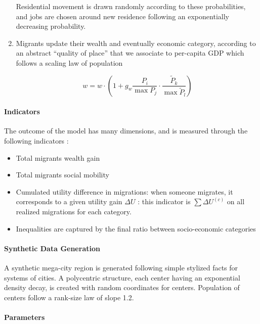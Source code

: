 \begin{enumerate}
Residential movement is drawn randomly according to these probabilities, and jobs are chosen around new residence following an exponentially decreasing probability.

\item Migrants update their wealth and eventually economic category, according to an abstract ``quality of place'' that we associate to per-capita GDP which follows a scaling law of population


\[
w = w\cdot \left( 1 + g_{w} \frac{P_i}{\max P_j} \cdot \frac{\tilde{P}_k}{\max \tilde{P}_l} \right)
\]

\end{enumerate}


\paragraph{Indicators}

The outcome of the model has many dimensions, and is measured through the following indicators :

\begin{itemize}
\item Total migrants wealth gain
\item Total migrants social mobility
\item Cumulated utility difference in migrations: when someone migrates, it corresponds to a given utility gain $\Delta U$ : this indicator is $\sum \Delta U^{(c)}$ on all realized migrations for each category.
\item Inequalities are captured by the final ratio between socio-economic categories
\end{itemize}


\paragraph{Synthetic Data Generation}

A synthetic mega-city region is generated following simple stylized facts for systems of cities. A polycentric structure, each center having an exponential density decay, is created with random coordinates for centers. Population of centers follow a rank-size law of slope 1.2.


\paragraph{Parameters}

